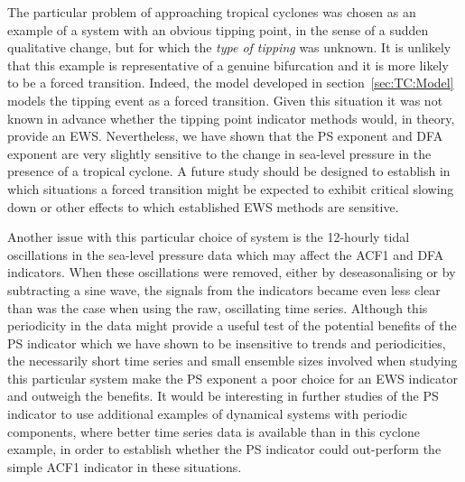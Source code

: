 The particular problem of approaching tropical cyclones was chosen as an example of a system with an obvious tipping point, in the sense of a sudden qualitative change, but for which the \emph{type of tipping} was unknown. It is unlikely that this example is representative of a genuine bifurcation and it is more likely to be a forced transition. Indeed, the model developed in section~\ref{sec:TC:Model} models the tipping event as a forced transition. Given this situation it was not known in advance whether the tipping point indicator methods would, in theory, provide an EWS. Nevertheless, we have shown that the PS exponent and DFA exponent are very slightly sensitive to the change in sea-level pressure in the presence of a tropical cyclone. A future study should be designed to establish in which situations a forced transition might be expected to exhibit critical slowing down or other effects to which established EWS methods are sensitive.

Another issue with this particular choice of system is the 12-hourly tidal oscillations in the sea-level pressure data which may affect the ACF1 and DFA indicators. When these oscillations were removed, either by deseasonalising or by subtracting a sine wave, the signals from the indicators became even less clear than was the case when using the raw, oscillating time series. Although this periodicity in the data might provide a useful test of the potential benefits of the PS indicator which we have shown to be insensitive to trends and periodicities, the necessarily short time series and small ensemble sizes involved when studying this particular system make the PS exponent a poor choice for an EWS indicator and outweigh the benefits. It would be interesting in further studies of the PS indicator to use additional examples of dynamical systems with periodic components, where better time series data is available than in this cyclone example, in order to establish whether the PS indicator could out-perform the simple ACF1 indicator in these situations. 


